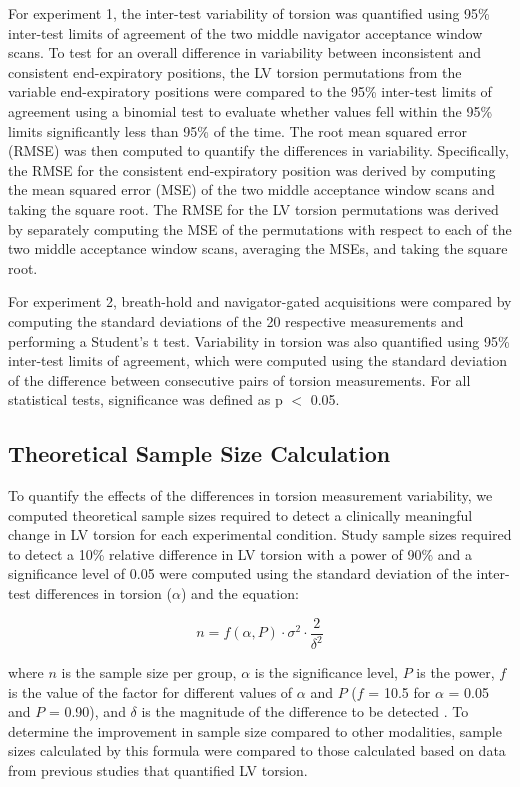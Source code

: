 	For experiment 1, the inter-test variability of torsion was quantified using 95\% inter-test limits of agreement of the two middle navigator acceptance window scans. To test for an overall difference in variability between inconsistent and consistent end-expiratory positions, the LV torsion permutations from the variable end-expiratory positions were compared to the 95\% inter-test limits of agreement using a binomial test to evaluate whether values fell within the 95\% limits significantly less than 95\% of the time. The root mean squared error (RMSE) was then computed to quantify the differences in variability. Specifically, the RMSE for the consistent end-expiratory position was derived by computing the mean squared error (MSE) of the two middle acceptance window scans and taking the square root. The RMSE for the LV torsion permutations was derived by separately computing the MSE of the permutations with respect to each of the two middle acceptance window scans, averaging the MSEs, and taking the square root.

	For experiment 2, breath-hold and navigator-gated acquisitions were compared by computing the standard deviations of the 20 respective measurements and performing a Student's t test. Variability in torsion was also quantified using 95\% inter-test limits of agreement, which were computed using the standard deviation of the difference between consecutive pairs of torsion measurements. For all statistical tests, significance was defined as p $<$ 0.05.

\subsection{Theoretical Sample Size Calculation}
	To quantify the effects of the differences in torsion measurement variability, we computed theoretical sample sizes required to detect a clinically meaningful change in LV torsion for each experimental condition. Study sample sizes required to detect a 10\% relative difference in LV torsion with a power of 90\% and a significance level of 0.05 were computed using the standard deviation of the inter-test differences in torsion ($\alpha$) and the equation:

	\begin{equation}
		n=f(\alpha,P)\cdot\sigma^2\cdot\frac{2}{\delta^2}
		\label{eq:samplesize}
	\end{equation}
	
	where $n$ is the sample size per group, $\alpha$ is the significance level, $P$ is the power, $f$ is the value of the factor for different values of $\alpha$ and $P$ ($f$ = 10.5 for $\alpha$ = 0.05 and $P$ = 0.90), and $\delta$ is the magnitude of the difference to be detected \cite{Grothues2002}. To determine the improvement in sample size compared to other modalities, sample sizes calculated by this formula were compared to those calculated based on data from previous studies that quantified LV torsion.

